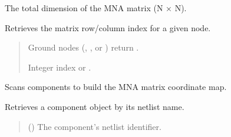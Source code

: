 \documentclass[letterpaper,10pt,english]{sphinxmanual}
\begin{document}
\begin{fulllineitems}

\begin{fulllineitems}
\label{\detokenize{circuit:Circuit.total_dim}}
\pysigstartsignatures
\pysigline
{}
\pysigstopsignatures
\sphinxAtStartPar
The total dimension of the MNA matrix (N × N).

\end{fulllineitems}


\begin{fulllineitems}
\label{\detokenize{circuit:Circuit.get_idx}}
\pysigstartsignatures
\pysiglinewithargsret
{}
{}
{}
\pysigstopsignatures
\sphinxAtStartPar
Retrieves the matrix row/column index for a given node.
\begin{quote}\begin{description}
\sphinxAtStartPar
{} \textendash{} Ground nodes (, , or ) return .

\sphinxAtStartPar
Integer index or .

\end{description}\end{quote}

\end{fulllineitems}


\begin{fulllineitems}
\label{\detokenize{circuit:Circuit._build_node_index}}
\pysigstartsignatures
\pysiglinewithargsret
{}
{}
{}
\pysigstopsignatures
\sphinxAtStartPar
Scans components to build the MNA matrix coordinate map.

\end{fulllineitems}


\begin{fulllineitems}
\label{\detokenize{circuit:Circuit.get_component}}
\pysigstartsignatures
\pysiglinewithargsret
{}
{}
{}
\pysigstopsignatures
\sphinxAtStartPar
Retrieves a component object by its netlist name.
\begin{quote}\begin{description}
\sphinxAtStartPar
{} () \textendash{} The component’s netlist identifier.


\end{description}
\end{quote}
\end{fulllineitems}
\end{fulllineitems}
\end{document}
